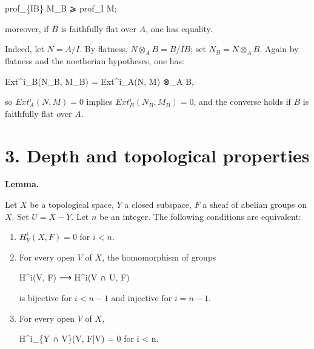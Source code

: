 \documentclass[
  11pt,
  a4paper,
]{book}
\newenvironment{Shaded}{}{}
\newcommand{\NormalTok}[1]{#1}
\begin{document}
\begin{Shaded}
\begin{Highlighting}[]
\NormalTok{prof\_\{IB\} M\_B ⩾ prof\_I M;}
\end{Highlighting}
\end{Shaded}

moreover, if \(B\) is faithfully flat over \(A\), one has equality.

Indeed, let \(N = A/I\). By flatness, \(N \otimes_{A} B = B/IB\); set
\(N_{B} = N \otimes_{A} B\). Again by flatness and the noetherian
hypotheses, one has:

\begin{Shaded}
\begin{Highlighting}[]
\NormalTok{Ext\^{}i\_B(N\_B, M\_B) = Ext\^{}i\_A(N, M) ⊗\_A B,}
\end{Highlighting}
\end{Shaded}

so \(Ext^{i}_{A}(N, M) = 0\) implies \(Ext^{i}_{B}(N_{B}, M_{B}) = 0\),
and the converse holds if \(B\) is faithfully flat over \(A\).

\section{3. Depth and topological
properties}\label{depth-and-topological-properties}

\textbf{Lemma.}

Let \(X\) be a topological space, \(Y\) a closed subspace, \(F\) a sheaf
of abelian groups on \(X\). Set \(U = X - Y\). Let \(n\) be an integer.
The following conditions are equivalent:

\begin{enumerate}
\def\labelenumi{\arabic{enumi}.}
\item
  \(H^{i}_{Y}(X, F) = 0\) for \(i < n\).
\item
  For every open \(V\) of \(X\), the homomorphism of groups

\begin{Shaded}
\begin{Highlighting}[]
\NormalTok{H\^{}i(V, F) ⟶ H\^{}i(V ∩ U, F)}
\end{Highlighting}
\end{Shaded}

  is bijective for \(i < n - 1\) and injective for \(i = n - 1\).
\item
  For every open \(V\) of \(X\),

\begin{Shaded}
\begin{Highlighting}[]
\NormalTok{H\^{}i\_\{Y ∩ V\}(V, F|V) = 0 for i \textless{} n.}
\end{Highlighting}
\end{Shaded}
\end{enumerate}
\end{document}
